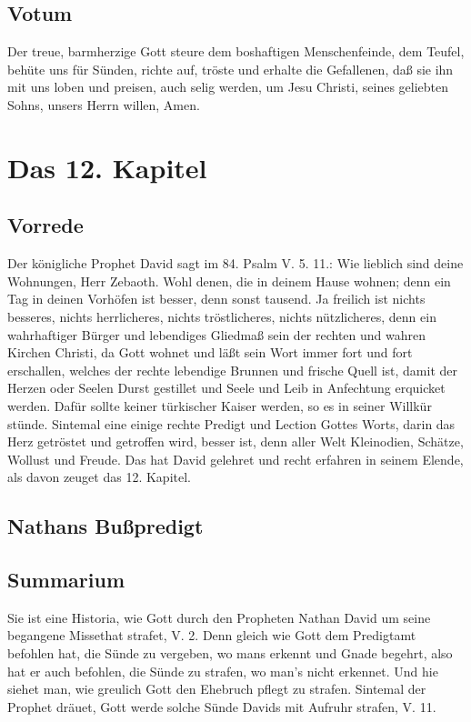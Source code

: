 \section{Votum}

Der treue, barmherzige Gott steure dem boshaftigen Menschenfeinde, dem Teufel, behüte uns für Sünden, richte auf, tröste und erhalte die Gefallenen, daß sie ihn mit uns loben und preisen, auch selig werden, um Jesu Christi, seines geliebten Sohns, unsers Herrn willen, Amen.

\chapter{Das 12. Kapitel}

\section{Vorrede}

Der königliche Prophet David sagt im 84. Psalm V. 5. 11.: Wie lieblich sind deine Wohnungen, Herr Zebaoth. Wohl denen, die in deinem Hause wohnen; denn ein Tag in deinen Vorhöfen ist besser, denn sonst tausend. Ja freilich ist nichts besseres, nichts herrlicheres, nichts tröstlicheres, nichts nützlicheres, denn ein wahrhaftiger Bürger und lebendiges Gliedmaß sein der rechten und wahren Kirchen Christi, da Gott wohnet und läßt sein Wort immer fort und fort erschallen, welches der rechte lebendige Brunnen und frische Quell ist, damit der Herzen oder Seelen Durst gestillet und Seele und Leib in Anfechtung erquicket werden. Dafür sollte keiner türkischer Kaiser werden, so es in seiner Willkür stünde. Sintemal eine einige rechte Predigt und Lection Gottes Worts, darin das Herz getröstet und getroffen wird, besser ist, denn aller Welt Kleinodien, Schätze, Wollust und Freude. Das hat David gelehret und recht erfahren in seinem Elende, als davon zeuget das 12. Kapitel.

\section{Nathans Bußpredigt}

\section{Summarium}

Sie ist eine Historia, wie Gott durch den Propheten Nathan David um seine begangene Missethat strafet, V. 2. Denn gleich wie Gott dem Predigtamt befohlen hat, die Sünde zu vergeben, wo mans erkennt und Gnade begehrt,
also hat er auch befohlen, die Sünde zu strafen, wo man’s nicht erkennet. Und hie siehet man, wie greulich Gott den Ehebruch pflegt zu strafen. Sintemal der Prophet dräuet, Gott werde solche Sünde Davids mit Aufruhr strafen, V. 11.

